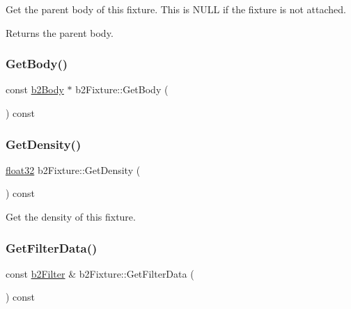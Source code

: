 Get the parent body of this fixture. This is N\+U\+LL if the fixture is not attached. \begin{DoxyReturn}{Returns}
the parent body. 
\end{DoxyReturn}
\mbox{\label{classb2_fixture_ae9cabf82e360f92e8fcb36b1923ab991}} 
\subsubsection{\texorpdfstring{GetBody()}{GetBody()}\hspace{0.1cm}{\footnotesize\ttfamily [2/2]}}
{\footnotesize\ttfamily const \mbox{\hyperlink{classb2_body}{b2\+Body}} $\ast$ b2\+Fixture\+::\+Get\+Body (\begin{DoxyParamCaption}{ }\end{DoxyParamCaption}) const\hspace{0.3cm}{\ttfamily [inline]}}

\mbox{\label{classb2_fixture_a228861bb1b1d7b2fb6e091401340784e}} 
\subsubsection{\texorpdfstring{GetDensity()}{GetDensity()}}
{\footnotesize\ttfamily \mbox{\hyperlink{b2_settings_8h_aacdc525d6f7bddb3ae95d5c311bd06a1}{float32}} b2\+Fixture\+::\+Get\+Density (\begin{DoxyParamCaption}{ }\end{DoxyParamCaption}) const\hspace{0.3cm}{\ttfamily [inline]}}



Get the density of this fixture. 

\mbox{\label{classb2_fixture_ad956250d9f684a407992ec178320127e}} 
\subsubsection{\texorpdfstring{GetFilterData()}{GetFilterData()}}
{\footnotesize\ttfamily const \mbox{\hyperlink{structb2_filter}{b2\+Filter}} \& b2\+Fixture\+::\+Get\+Filter\+Data (\begin{DoxyParamCaption}{ }\end{DoxyParamCaption}) const\hspace{0.3cm}{\ttfamily [inline]}}



